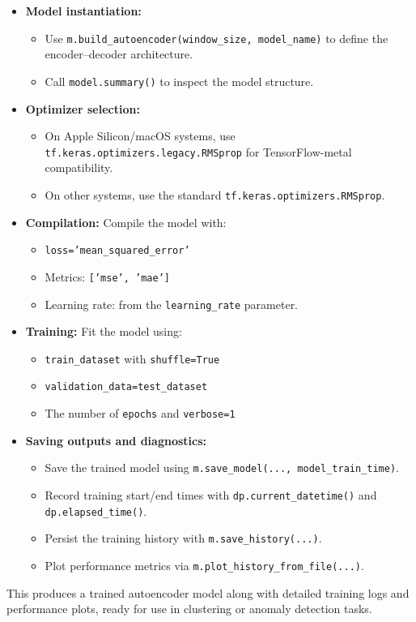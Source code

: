 \documentclass[11pt]{article}
\begin{document}
\begin{itemize}
  \item \textbf{Model instantiation:} 
    \begin{itemize}
      \item Use \texttt{m.build\_autoencoder(window\_size, model\_name)} to define the encoder–decoder architecture.
      \item Call \texttt{model.summary()} to inspect the model structure.
    \end{itemize}
  \item \textbf{Optimizer selection:}
    \begin{itemize}
      \item On Apple Silicon/macOS systems, use \texttt{tf.keras.optimizers.legacy.RMSprop} for TensorFlow-metal compatibility.
      \item On other systems, use the standard \texttt{tf.keras.optimizers.RMSprop}.
    \end{itemize}
  \item \textbf{Compilation:} Compile the model with:
    \begin{itemize}
      \item \texttt{loss='mean\_squared\_error'}
      \item Metrics: \texttt{['mse', 'mae']}
      \item Learning rate: from the \texttt{learning\_rate} parameter.
    \end{itemize}
  \item \textbf{Training:} Fit the model using:
    \begin{itemize}
      \item \texttt{train\_dataset} with \texttt{shuffle=True}
      \item \texttt{validation\_data=test\_dataset}
      \item The number of \texttt{epochs} and \texttt{verbose=1}
    \end{itemize}
  \item \textbf{Saving outputs and diagnostics:}
    \begin{itemize}
      \item Save the trained model using \texttt{m.save\_model(..., model\_train\_time)}.
      \item Record training start/end times with \texttt{dp.current\_datetime()} and \texttt{dp.elapsed\_time()}.
      \item Persist the training history with \texttt{m.save\_history(...)}.
      \item Plot performance metrics via \texttt{m.plot\_history\_from\_file(...)}.
    \end{itemize}
\end{itemize}

This produces a trained autoencoder model along with detailed training logs and performance plots, ready for use in clustering or anomaly detection tasks.
\end{document}
